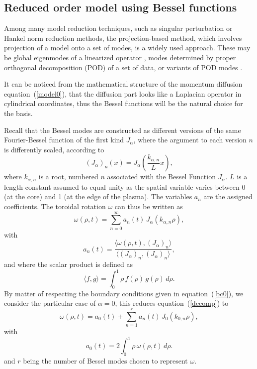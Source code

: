\documentclass[12pt]{iopart}
\begin{document}
\subsection{Reduced order model using Bessel functions}

Among many model reduction techniques, such as singular perturbation or Hankel norm reduction methods, the projection-based method, which involves projection of a model onto a set of modes, is a widely used approach. These may be global eigenmodes of a linearized operator \cite{Akervik07}, modes determined by proper orthogonal decomposition (POD) of a set of data, or variants of POD modes \cite{Holmes12}. 

It can be noticed from the mathematical structure of the momentum diffusion equation~(\ref{model0}), that the diffusion part looks like a Laplacian operator in cylindrical coordinates, thus the Bessel functions will be the natural choice for the basis. 

Recall that the Bessel modes are constructed as different versions of the same Fourier-Bessel function of the first kind $J_{\alpha}$, where the argument to each version $n$ is differently scaled, according to
\begin{equation}
(J_{\alpha})_n (x) = J_{\alpha} \left(  \frac{ k_{\alpha,n}}{L} x \right),
\label{defmod}
\end{equation}
where $ k_{\alpha,n}$ is a root, numbered $n$ associated with the Bessel Function $J_{\alpha}$. $L$ is a length constant assumed to equal unity as the spatial variable varies between 0 (at the core) and 1 (at the edge of the plasma). The variables $a_n$ are the assigned coefficients. The toroidal rotation $\omega$ can thus be written as 
\begin{equation}
\omega(\rho,t)  = \sum_{n=0}^{\infty} a_n(t) \, J_{\alpha} \left( { k_{\alpha,n}} \rho \right),
\label{decomp}
\end{equation}
 with
 \begin{equation}
a_n(t) = \frac{\langle \omega(\rho,t), \left(J_{\alpha} \right)_n \rangle }{\langle  \left(J_{\alpha} \right)_n ,  \left(J_{\alpha} \right)_n   \rangle},
\end{equation}
and where the scalar product is defined as 
\begin{equation}
\langle f,g \rangle =   \int^1 _0 \rho \, f(\rho) \, g(\rho) \, d\rho.
\end{equation}
By matter of respecting the boundary conditions given in equation~(\ref{bc0}), we consider the particular case of $\alpha = 0$, this reduces equation~(\ref{decomp}) to
\begin{equation}
\omega(\rho,t)  = a_0(t) + \sum_{n=1}^{r} a_n(t) \, J_{0} \left(  k_{0,n} \rho \right),
\end{equation}
with
\begin{equation}
a_0 (t) = {2} \int^1 _0 \rho \, \omega(\rho,t) \, d\rho.
\end{equation}
and $r$ being the number of Bessel modes chosen to represent $\omega$.
\end{document}

